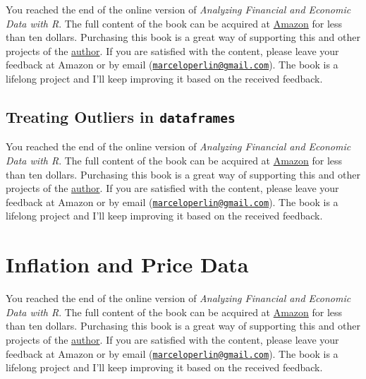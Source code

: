 \documentclass[
  12pt,
]{book}
\newenvironment{pleasebuyit}
{\begin{noteblock}
		
	} {\end{noteblock}}
\begin{document}
\begin{pleasebuyit}
You reached the end of the online version of \emph{Analyzing Financial
and Economic Data with R}. The full content of the book can be acquired
at \href{https://www.amazon.com/dp/B084LSNXMN}{Amazon} for less than ten
dollars. Purchasing this book is a great way of supporting this and
other projects of the \href{https://www.msperlin.com/blog/}{author}. If
you are satisfied with the content, please leave your feedback at Amazon
or by email
(\href{mailto:marceloperlin@gmail.com}{\nolinkurl{marceloperlin@gmail.com}}).
The book is a lifelong project and I'll keep improving it based on the
received feedback.
\end{pleasebuyit}

\hypertarget{outliers}{%
\subsection{\texorpdfstring{Treating Outliers in \texttt{dataframes}}{Treating Outliers in dataframes}}\label{outliers}}

\begin{pleasebuyit}
You reached the end of the online version of \emph{Analyzing Financial
and Economic Data with R}. The full content of the book can be acquired
at \href{https://www.amazon.com/dp/B084LSNXMN}{Amazon} for less than ten
dollars. Purchasing this book is a great way of supporting this and
other projects of the \href{https://www.msperlin.com/blog/}{author}. If
you are satisfied with the content, please leave your feedback at Amazon
or by email
(\href{mailto:marceloperlin@gmail.com}{\nolinkurl{marceloperlin@gmail.com}}).
The book is a lifelong project and I'll keep improving it based on the
received feedback.
\end{pleasebuyit}

\hypertarget{inflation-and-price-data}{%
\section{Inflation and Price Data}\label{inflation-and-price-data}}

\begin{pleasebuyit}
You reached the end of the online version of \emph{Analyzing Financial
and Economic Data with R}. The full content of the book can be acquired
at \href{https://www.amazon.com/dp/B084LSNXMN}{Amazon} for less than ten
dollars. Purchasing this book is a great way of supporting this and
other projects of the \href{https://www.msperlin.com/blog/}{author}. If
you are satisfied with the content, please leave your feedback at Amazon
or by email
(\href{mailto:marceloperlin@gmail.com}{\nolinkurl{marceloperlin@gmail.com}}).
The book is a lifelong project and I'll keep improving it based on the
received feedback.
\end{pleasebuyit}
\end{document}
